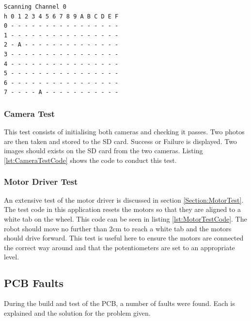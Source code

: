 \begin{lstlisting}[caption={Result of \itc bus scan with Channel 0 of the \itc MUX selected},label={lst:I2CTest}]
Scanning Channel 0
h 0 1 2 3 4 5 6 7 8 9 A B C D E F
0 - - - - - - - - - - - - - - - -
1 - - - - - - - - - - - - - - - -
2 - A - - - - - - - - - - - - - -
3 - - - - - - - - - - - - - - - -
4 - - - - - - - - - - - - - - - -
5 - - - - - - - - - - - - - - - -
6 - - - - - - - - - - - - - - - -
7 - - - - A - - - - - - - - - - -
\end{lstlisting}

\subsubsection{Camera Test}

This test consists of initialising both cameras and checking it passes. Two photos are then taken and stored to the SD card. Success or Failure is displayed. Two images should exists on the SD card from the two cameras. Listing \ref{lst:CameraTestCode} shows the code to conduct this test.


\subsubsection{Motor Driver Test}
An extensive test of the motor driver is discussed in section \ref{Section:MotorTest}. The test code in this application resets the motors so that they are aligned to a white tab on the wheel. This code can be seen in listing \ref{lst:MotorTestCode}. The robot should move no further than 2cm to reach a white tab and the motors should drive forward. This test is useful here to ensure the motors are connected the correct way around and that the potentiometers are set to an appropriate level.



\subsection{PCB Faults}
During the build and test of the PCB, a number of faults were found. Each is explained and the solution for the problem given. 
